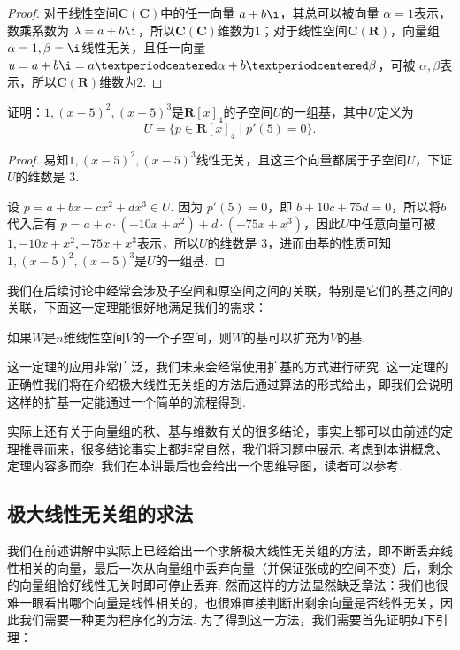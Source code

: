 \begin{proof}
    对于线性空间$\mathbf{C}(\mathbf{C})$中的任一向量 $a + b\i$，其总可以被向量 $\alpha = 1$表示，数乘系数为 $\lambda = a + b\i$，所以$\mathbf{C}(\mathbf{C})$维数为1；对于线性空间$\mathbf{C}(\mathbf{R})$，向量组 $\alpha = 1, \beta = \i$线性无关，且任一向量 $u = a + b\i = a·\alpha + b·\beta$，可被 $\alpha, \beta$表示，所以$\mathbf{C}(\mathbf{R})$维数为2.
\end{proof}

\begin{example}{}{}
    证明：$1,(x-5)^2,(x-5)^3$是$\mathbf{R}[x]_4$的子空间$U$的一组基，其中$U$定义为
    \[U=\{p\in\mathbf{R}[x]_4 \mid p'(5)=0\}.\]
\end{example}

\begin{proof}
    易知$1,(x-5)^2,(x-5)^3$线性无关，且这三个向量都属于子空间$U$，下证$U$的维数是 3.

    设 $p = a + bx + cx^2 + dx^3 \in U$. 因为 $p'(5) = 0$，即 $b + 10c +75d = 0$，所以将$b$代入后有 $p = a + c·(-10x + x^2) + d·(-75x + x^3)$，因此$U$中任意向量可被$1, -10x + x^2, -75x + x^3$表示，所以$U$的维数是 3，进而由基的性质可知$1,(x-5)^2,(x-5)^3$是$U$的一组基.
\end{proof}

我们在后续讨论中经常会涉及子空间和原空间之间的关联，特别是它们的基之间的关联，下面这一定理能很好地满足我们的需求：
\begin{theorem}{}{}
    如果$W$是$n$维线性空间$V$的一个子空间，则$W$的基可以扩充为$V$的基.
\end{theorem}
这一定理的应用非常广泛，我们未来会经常使用扩基的方式进行研究. 这一定理的正确性我们将在介绍极大线性无关组的方法后通过算法的形式给出，即我们会说明这样的扩基一定能通过一个简单的流程得到.

实际上还有关于向量组的秩、基与维数有关的很多结论，事实上都可以由前述的定理推导而来，很多结论事实上都非常自然，我们将习题中展示. 考虑到本讲概念、定理内容多而杂. 我们在本讲最后也会给出一个思维导图，读者可以参考.

\subsection{极大线性无关组的求法}

我们在前述讲解中实际上已经给出一个求解极大线性无关组的方法，即不断丢弃线性相关的向量，最后一次从向量组中丢弃向量（并保证张成的空间不变）后，剩余的向量组恰好线性无关时即可停止丢弃. 然而这样的方法显然缺乏章法：我们也很难一眼看出哪个向量是线性相关的，也很难直接判断出剩余向量是否线性无关，因此我们需要一种更为程序化的方法. 为了得到这一方法，我们需要首先证明如下引理：

